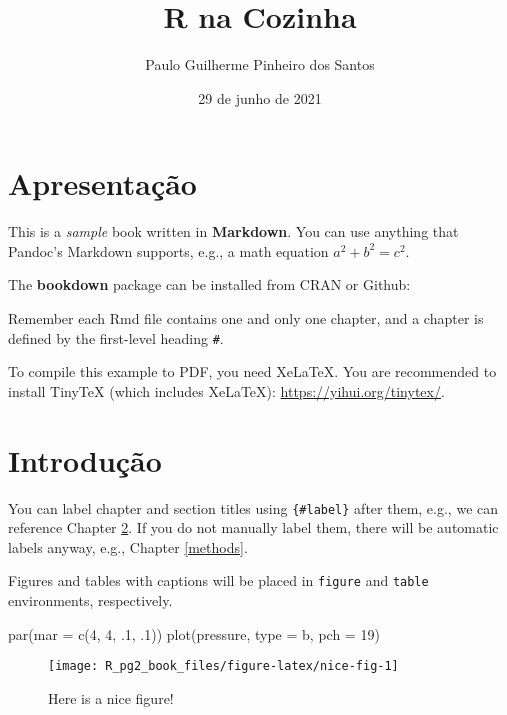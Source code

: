 \documentclass[
  brazilian,
]{book}
\title{R na Cozinha}
\author{Paulo Guilherme Pinheiro dos Santos}
\date{29 de junho de 2021}
\newenvironment{Shaded}{\begin{snugshade}}{\end{snugshade}}
\newcommand{\AttributeTok}[1]{\textcolor[rgb]{0.77,0.63,0.00}{#1}}
\newcommand{\DecValTok}[1]{\textcolor[rgb]{0.00,0.00,0.81}{#1}}
\newcommand{\FunctionTok}[1]{\textcolor[rgb]{0.00,0.00,0.00}{#1}}
\newcommand{\NormalTok}[1]{#1}
\newcommand{\StringTok}[1]{\textcolor[rgb]{0.31,0.60,0.02}{#1}}
\begin{document}
\maketitle

{
\setcounter{tocdepth}{1}
\tableofcontents
}
\hypertarget{apresentauxe7uxe3o}{%
\chapter{Apresentação}\label{apresentauxe7uxe3o}}

This is a \emph{sample} book written in \textbf{Markdown}. You can use anything that Pandoc's Markdown supports, e.g., a math equation \(a^2 + b^2 = c^2\).

The \textbf{bookdown} package can be installed from CRAN or Github:

Remember each Rmd file contains one and only one chapter, and a chapter is defined by the first-level heading \texttt{\#}.

To compile this example to PDF, you need XeLaTeX. You are recommended to install TinyTeX (which includes XeLaTeX): \url{https://yihui.org/tinytex/}.

\hypertarget{intro}{%
\chapter{Introdução}\label{intro}}

You can label chapter and section titles using \texttt{\{\#label\}} after them, e.g., we can reference Chapter \ref{intro}. If you do not manually label them, there will be automatic labels anyway, e.g., Chapter \ref{methods}.

Figures and tables with captions will be placed in \texttt{figure} and \texttt{table} environments, respectively.

\begin{Shaded}
\begin{Highlighting}[]
\FunctionTok{par}\NormalTok{(}\AttributeTok{mar =} \FunctionTok{c}\NormalTok{(}\DecValTok{4}\NormalTok{, }\DecValTok{4}\NormalTok{, .}\DecValTok{1}\NormalTok{, .}\DecValTok{1}\NormalTok{))}
\FunctionTok{plot}\NormalTok{(pressure, }\AttributeTok{type =} \StringTok{\textquotesingle{}b\textquotesingle{}}\NormalTok{, }\AttributeTok{pch =} \DecValTok{19}\NormalTok{)}
\end{Highlighting}
\end{Shaded}

\begin{figure}

{\centering \texttt{[image: R\_pg2\_book\_files/figure-latex/nice-fig-1]} 

}

\caption{Here is a nice figure!}\label{fig:nice-fig}
\end{figure}
\end{document}
